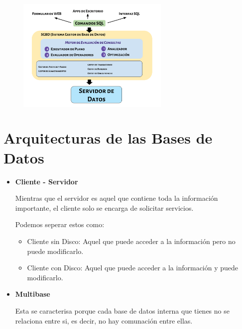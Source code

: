 \documentclass[12pt, fleqn]{report}                             %
\begin{document}
            \begin{figure}[h!]
                \centering
                \includegraphics[width=0.65\textwidth]{ArquitecturaSGBD.pdf}
            \end{figure}







        \clearpage
        \section{Arquitecturas de las Bases de Datos}


            \begin{itemize}

                \item
                    \textbf{Cliente - Servidor}

                    Mientras que el servidor es aquel que contiene toda la información 
                    importante, el cliente solo se encarga de solicitar servicios.

                    Podemos seperar estos como:
                    \begin{itemize}
                        \item Cliente sin Disco:
                            Aquel que puede acceder a la información pero no puede modificarlo.

                        \item Cliente con Disco:
                            Aquel que puede acceder a la información y puede modificarlo.
                     \end{itemize} 


                \item
                    \textbf{Multibase}

                    Esta se caracterisa porque cada base de datos interna que tienes no se relaciona
                    entre si, es decir, no hay comunación entre ellas.

                        
            \end{itemize}
\end{document}
